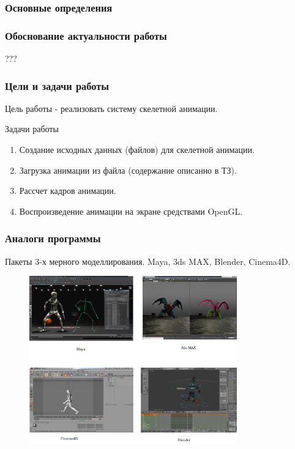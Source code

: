 \documentclass{beamer}
\begin{document}
\begin{frame}
\frametitle{Основные определения}
    
\end{frame}


\begin{frame}
\frametitle{Обоснование актуальности работы}
    \begin{center}            
    \begin{large}
    ???
    \end{large}
    \end{center}
\end{frame}



\begin{frame}
\frametitle{Цели и задачи работы}
    Цель работы - реализовать систему скелетной анимации.
    
    \bigskip
    
    Задачи работы
    
    \smallskip
	\begin{enumerate}
	\item Создание исходных данных (файлов) для скелетной анимации.
	\item Загрузка анимации из файла (содержание описанно в ТЗ).
	\item Рассчет кадров анимации.
	\item Воспроизведение анимации на экране средствами OpenGL.
	\end{enumerate}
    
\end{frame}



\begin{frame}
\frametitle{Аналоги программы}
    \scriptsize{Пакеты 3-х мерного моделлирования. Maya, 3ds MAX, Blender, Cinema4D.}
\begin{figure}[h!]
    \centering
    \includegraphics[width=0.8\textwidth]{all_tools.png}
\end{figure}

\end{frame}
\end{document}
